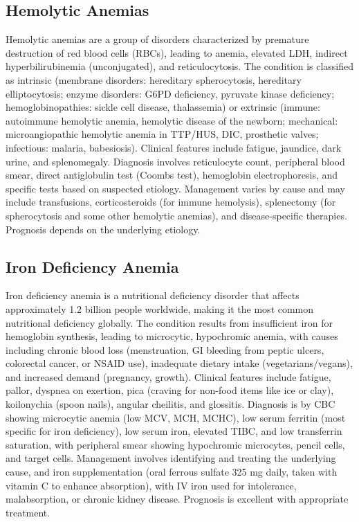 \subsection{Hemolytic Anemias}
\label{sec:Hemolytic Anemias}
Hemolytic anemias are a group of disorders characterized by premature destruction of red blood cells (RBCs), leading to anemia, elevated LDH, indirect hyperbilirubinemia (unconjugated), and reticulocytosis. The condition is classified as intrinsic (membrane disorders: hereditary spherocytosis, hereditary elliptocytosis; enzyme disorders: G6PD deficiency, pyruvate kinase deficiency; hemoglobinopathies: sickle cell disease, thalassemia) or extrinsic (immune: autoimmune hemolytic anemia, hemolytic disease of the newborn; mechanical: microangiopathic hemolytic anemia in TTP/HUS, DIC, prosthetic valves; infectious: malaria, babesiosis). Clinical features include fatigue, jaundice, dark urine, and splenomegaly. Diagnosis involves reticulocyte count, peripheral blood smear, direct antiglobulin test (Coombs test), hemoglobin electrophoresis, and specific tests based on suspected etiology. Management varies by cause and may include transfusions, corticosteroids (for immune hemolysis), splenectomy (for spherocytosis and some other hemolytic anemias), and disease-specific therapies. Prognosis depends on the underlying etiology.

\subsection{Iron Deficiency Anemia}
\label{sec:Iron Deficiency Anemia}
Iron deficiency anemia is a nutritional deficiency disorder that affects approximately 1.2 billion people worldwide, making it the most common nutritional deficiency globally. The condition results from insufficient iron for hemoglobin synthesis, leading to microcytic, hypochromic anemia, with causes including chronic blood loss (menstruation, GI bleeding from peptic ulcers, colorectal cancer, or NSAID use), inadequate dietary intake (vegetarians/vegans), and increased demand (pregnancy, growth). Clinical features include fatigue, pallor, dyspnea on exertion, pica (craving for non-food items like ice or clay), koilonychia (spoon nails), angular cheilitis, and glossitis. Diagnosis is by CBC showing microcytic anemia (low MCV, MCH, MCHC), low serum ferritin (most specific for iron deficiency), low serum iron, elevated TIBC, and low transferrin saturation, with peripheral smear showing hypochromic microcytes, pencil cells, and target cells. Management involves identifying and treating the underlying cause, and iron supplementation (oral ferrous sulfate 325 mg daily, taken with vitamin C to enhance absorption), with IV iron used for intolerance, malabsorption, or chronic kidney disease. Prognosis is excellent with appropriate treatment.

